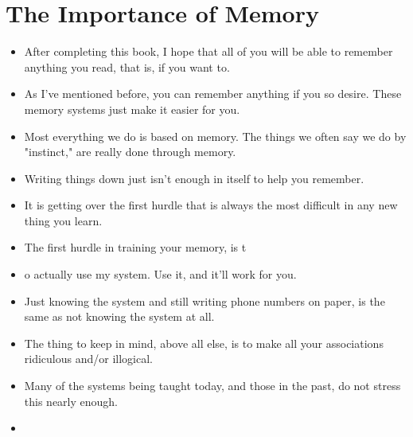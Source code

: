     \section* {The Importance of Memory}
        \begin{itemize}
            \item After completing this book, I hope that all of you will be
            able to remember anything you read, that is, if you want to.
            \item As I've mentioned before, you can remember anything if
            you so desire. These memory systems just make it easier for
            you.
            \item Most everything we do is based on
            memory. The things we often say we do by "instinct," are
            really done through memory.
            \item Writing things down just isn't enough in itself to help
            you remember.
            \item It is getting over the first hurdle that is always the most
            difficult in any new thing you learn.
            \item The first hurdle in
            training your memory, is t
            \item o actually use my system. Use
            it, and it'll work for you.
            \item Just knowing the system and still
            writing phone numbers on paper, is the same as not knowing the system at all.
            \item The thing to keep in mind, above all else, is to make all
            your associations ridiculous and/or illogical.
            \item Many of the
            systems being taught today, and those in the past, do not
            stress this nearly enough.
            \item
        \end{itemize}

